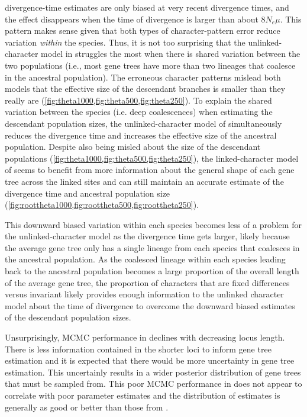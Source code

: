 \ecoevolity divergence-time estimates are only biased at
very recent divergence times, and the effect disappears
when the time of divergence is larger than about $8N_e\mu$.
This pattern makes sense given that both types of character-pattern error
reduce variation \emph{within} the species.
Thus, it is not too surprising that the unlinked-character model in \ecoevolity
struggles the most when there is shared variation between
the two populations (i.e., most gene trees have more than
two lineages that coalesce in the ancestral population).
The erroneous character patterns mislead both models that the effective size of
the descendant branches is smaller than they really are
(\cref{fig:theta1000,fig:theta500,fig:theta250}).
To explain the shared variation between the species (i.e. deep coalescences)
when estimating the descendant population sizes,
the unlinked-character model of \ecoevolity
simultaneously reduces the divergence time and increases the effective
size of the ancestral population.
Despite also being misled about the size of the descendant populations
(\cref{fig:theta1000,fig:theta500,fig:theta250}),
the linked-character model of \beast seems to benefit from more information
about the general shape of each gene tree across the linked sites and can still
maintain an accurate estimate of the divergence time
\timefigsp
and ancestral population size
(\cref{fig:roottheta1000,fig:roottheta500,fig:roottheta250}).

This downward biased variation within each species becomes
less of a problem for the unlinked-character model as the
divergence time gets larger, likely because the average gene
tree only has a single lineage from each species that coalesces
in the ancestral population.
As the coalesced lineage within each species leading back
to the ancestral population becomes a large proportion
of the overall length of the average gene tree,
the proportion of characters that are fixed differences versus invariant
likely provides enough information to
the unlinked character model about the time of divergence to overcome
the downward biased estimates of the descendant population sizes.

Unsurprisingly, MCMC performance in \beast declines with decreasing locus length.
There is less information contained in the shorter loci to inform gene tree estimation 
and it is expected that there would be more uncertainty in gene tree estimation.
This uncertainly results in a wider posterior distribution of gene trees that must be 
sampled from. This poor MCMC performance in \beast does not appear to correlate 
with poor parameter estimates and the distribution of estimates is generally as 
good or better than those from \ecoevolity. 


